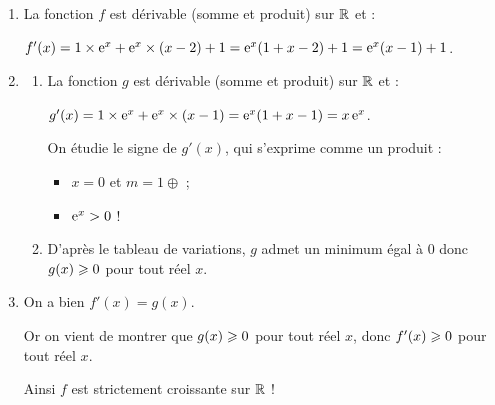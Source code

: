 \documentclass[a4paper,11pt]{article}
\begin{document}
\begin{enumerate}
	\item La fonction $f$ est dérivable (somme et produit) sur $\R$ et :
	
	\hspace{5mm}$f'(x)=1 \times {\rm e}^x + {\rm e}^x \times (x-2) + 1 = {\rm e}^x (1+x-2)+1 = {\rm e}^x(x-1)+1$.
	\item 
	\begin{enumerate}
		\item La fonction $g$ est dérivable (somme et produit) sur $\R$ et :
		
		\hspace{5mm}$g'(x)= 1 \times {\rm e}^x + {\rm e}^x \times (x-1) = {\rm e}^x (1+x-1) = x\,{\rm e}^x$.
		
		On étudie le signe de $g'(x)$, qui s'exprime comme un produit :
		
		\begin{itemize}
			\item $x=0$ et $m=1\oplus$ ;
			\item ${\rm e}^x > 0$ !
		\end{itemize}
		
		\begin{center}
		\end{center}
		\item D'après le tableau de variations, $g$ admet un minimum égal à $0$ donc $g(x) \geqslant  0$ pour tout réel $x$.
	\end{enumerate}
	\item On a bien $f'(x) =  g(x)$.
	
	Or on vient de montrer que $g(x)\geqslant  0$ pour tout réel $x$, donc $f'(x) \geqslant  0$ pour tout réel $x$.
	
	Ainsi $f$ est strictement croissante sur $\R$ !
\end{enumerate}

\pagebreak

\end{document}
